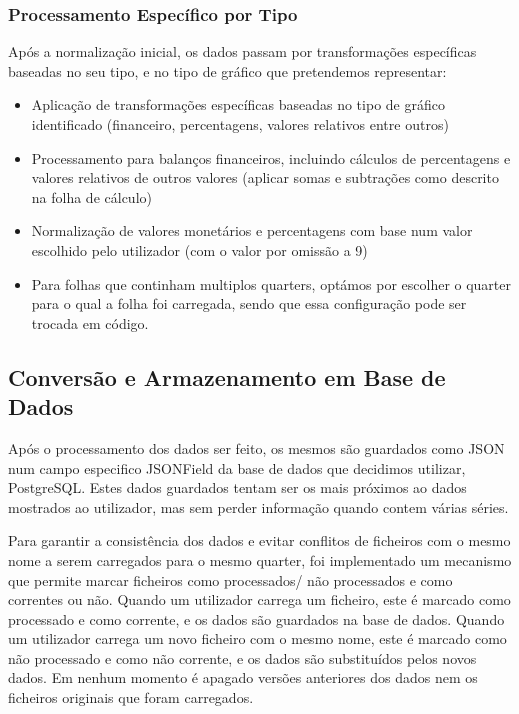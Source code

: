 \subsubsection{Processamento Específico por Tipo}
Após a normalização inicial, os dados passam por transformações específicas baseadas no seu tipo, e no tipo de gráfico que pretendemos representar:
\begin{itemize}
    \item Aplicação de transformações específicas baseadas no tipo de gráfico identificado (financeiro, percentagens, valores relativos entre outros)
    \item Processamento para balanços financeiros, incluindo cálculos de percentagens e valores relativos de outros valores (aplicar somas e subtrações como descrito na folha de cálculo)
    \item Normalização de valores monetários e percentagens com base num valor escolhido pelo utilizador (com o valor por omissão a 9)
    \item Para folhas que continham multiplos quarters, optámos por escolher o quarter para o qual a folha foi carregada, sendo que essa configuração pode ser trocada em código.
\end{itemize}

\subsection{Conversão e Armazenamento em Base de Dados}

Após o processamento dos dados ser feito, os mesmos são guardados como JSON num campo especifico JSONField da base de dados que decidimos utilizar, PostgreSQL. Estes dados guardados tentam ser os mais próximos ao dados mostrados ao utilizador, mas sem perder informação quando contem várias séries.

Para garantir a consistência dos dados e evitar conflitos de ficheiros com o mesmo nome a serem carregados para o mesmo quarter, foi implementado um mecanismo que permite marcar ficheiros como processados/ não processados e como correntes ou não. Quando um utilizador carrega um ficheiro, este é marcado como processado e como corrente, e os dados são guardados na base de dados. Quando um utilizador carrega um novo ficheiro com o mesmo nome, este é marcado como não processado e como não corrente, e os dados são substituídos pelos novos dados. Em nenhum momento é apagado versões anteriores dos dados nem os ficheiros originais que foram carregados.

